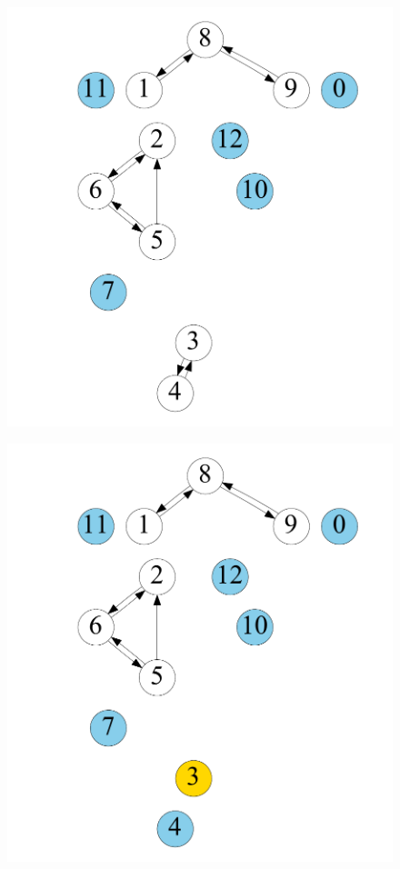 \begin{figure}[t]
\begin{minipage}[b]{0.19\linewidth}
		{\includegraphics[width=\textwidth]{./alg_fig/scc-g1}}
	\end{minipage}
	\begin{minipage}[b]{0.19\linewidth}
		\centering
		{\includegraphics[width=\textwidth]{./alg_fig/scc-g3}}

\end{minipage}
\end{figure}
